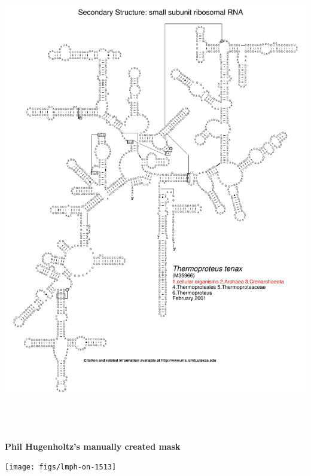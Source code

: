 \documentclass[landscape]{slides}
\begin{document}
\begin{slide}\begin{center}\includegraphics[height=8in]{figs/arc-25}\end{center}\vfill\end{slide}
\begin{slide}
\begin{center}
\textbf{Phil Hugenholtz's manually created mask}
\end{center}
\small

\begin{center}
\texttt{[image: figs/lmph-on-1513]}

\end{center}
\vfill
\end{slide}
\end{document}
